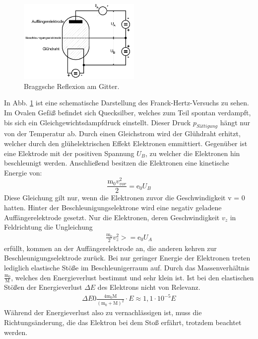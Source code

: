 \begin{figure}
    \centering
    \includegraphics[height=4.0cm]{data/abb1.jpg}
    \caption{Braggsche Reflexion am Gitter. \cite{V601}}
    \label{fig:abb1}
\end{figure}
\noindent
In Abb. \ref{fig:abb1} ist eine schematische Darstellung des Franck-Hertz-Versuchs zu sehen.
Im Ovalen Gefäß befindet sich Quecksilber, welches zum Teil spontan verdampft, bis sich ein Gleichgewichtsdampfdruck einstellt.
Dieser Druck $p_{Sättigung}$ hängt nur von der Temperatur ab.
Durch einen Gleichstrom wird der Glühdraht erhitzt, welcher durch den glühelektrischen Effekt Elektronen emmittiert.
Gegenüber ist eine Elektrode mit der positiven Spannung $U_B$, zu welcher die Elektronen hin beschleunigt werden.
Anschließend besitzen die Elektronen eine kinetische Energie von:
\begin{equation}
    \frac{\text{m}_0 v_{vor}^2}{2} = \text{e}_0 U_B
    \label{eqn:gl2}
\end{equation}
Diese Gleichung gilt nur, wenn die Elektronen zuvor die Geschwindigkeit v = 0 hatten.
Hinter der Beschleunigungselektrone wird eine negativ geladene Auffängerelektrode gesetzt.
Nur die Elektronen, deren Geschwindigkeit $v_z$ in Feldrichtung die Ungleichung
\begin{align*}
    \frac{\text{m}_0}{2}v_z^2 >= \text{e}_0 U_A
\end{align*}
erfüllt, kommen an der Auffängerelektrode an, die anderen kehren zur Beschleunigungselektrode zurück.
Bei nur geringer Energie der Elektronen treten lediglich elastische Stöße im Beschleunigerraum auf.
Durch das Massenverhältnis $\frac{\text{m}_0}{\text{M}}$, welches den Energieverlust bestimmt und sehr klein ist.
Ist bei den elastischen Stößen der Energieverlust $\Delta E$ des Elektrons nicht von Relevanz.
\begin{align*}
    \Delta E 0 \frac{4 \text{m}_0 \text{M}}{(\text{m}_0 + \text{M})^2} \cdot E \approx 1,1 \cdot 10^{-5} E
\end{align*}
Während der Energieverlust also zu vernachlässigen ist, muss die Richtungsänderung, die das Elektron bei dem Stoß erfährt, trotzdem beachtet werden.
